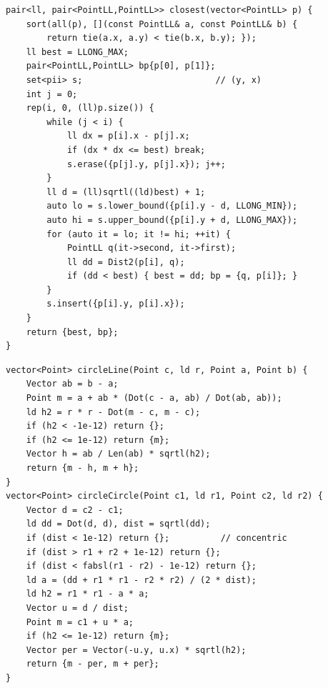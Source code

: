 \begin{lstlisting}
pair<ll, pair<PointLL,PointLL>> closest(vector<PointLL> p) {
    sort(all(p), [](const PointLL& a, const PointLL& b) {
        return tie(a.x, a.y) < tie(b.x, b.y); });
    ll best = LLONG_MAX;
    pair<PointLL,PointLL> bp{p[0], p[1]};
    set<pii> s;                          // (y, x)
    int j = 0;
    rep(i, 0, (ll)p.size()) {
        while (j < i) {
            ll dx = p[i].x - p[j].x;
            if (dx * dx <= best) break;
            s.erase({p[j].y, p[j].x}); j++;
        }
        ll d = (ll)sqrtl((ld)best) + 1;
        auto lo = s.lower_bound({p[i].y - d, LLONG_MIN});
        auto hi = s.upper_bound({p[i].y + d, LLONG_MAX});
        for (auto it = lo; it != hi; ++it) {
            PointLL q(it->second, it->first);
            ll dd = Dist2(p[i], q);
            if (dd < best) { best = dd; bp = {q, p[i]}; }
        }
        s.insert({p[i].y, p[i].x});
    }
    return {best, bp};
}
\end{lstlisting}


\begin{lstlisting}
vector<Point> circleLine(Point c, ld r, Point a, Point b) {
    Vector ab = b - a;
    Point m = a + ab * (Dot(c - a, ab) / Dot(ab, ab));
    ld h2 = r * r - Dot(m - c, m - c);
    if (h2 < -1e-12) return {};
    if (h2 <= 1e-12) return {m};
    Vector h = ab / Len(ab) * sqrtl(h2);
    return {m - h, m + h};
}
vector<Point> circleCircle(Point c1, ld r1, Point c2, ld r2) {
    Vector d = c2 - c1;
    ld dd = Dot(d, d), dist = sqrtl(dd);
    if (dist < 1e-12) return {};          // concentric
    if (dist > r1 + r2 + 1e-12) return {};
    if (dist < fabsl(r1 - r2) - 1e-12) return {};
    ld a = (dd + r1 * r1 - r2 * r2) / (2 * dist);
    ld h2 = r1 * r1 - a * a;
    Vector u = d / dist;
    Point m = c1 + u * a;
    if (h2 <= 1e-12) return {m};
    Vector per = Vector(-u.y, u.x) * sqrtl(h2);
    return {m - per, m + per};
}
\end{lstlisting}

